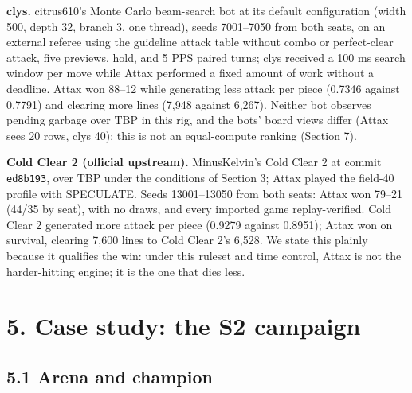 \documentclass[
  11pt,
]{article}
\begin{document}
\textbf{clys.} citrus610's Monte Carlo beam-search bot at its default
configuration (width 500, depth 32, branch 3, one thread), seeds
7001--7050 from both seats, on an external referee using the guideline
attack table without combo or perfect-clear attack, five previews, hold,
and 5 PPS paired turns; clys received a 100 ms search window per move
while Attax performed a fixed amount of work without a deadline. Attax
won 88--12 while generating less attack per piece (0.7346 against
0.7791) and clearing more lines (7,948 against 6,267). Neither bot
observes pending garbage over TBP in this rig, and the bots' board views
differ (Attax sees 20 rows, clys 40); this is not an equal-compute
ranking (Section 7).

\textbf{Cold Clear 2 (official upstream).} MinusKelvin's Cold Clear 2 at
commit \texttt{ed8b193}, over TBP under the conditions of Section 3;
Attax played the field-40 profile with SPECULATE. Seeds 13001--13050
from both seats: Attax won 79--21 (44/35 by seat), with no draws, and
every imported game replay-verified. Cold Clear 2 generated more attack
per piece (0.9279 against 0.8951); Attax won on survival, clearing 7,600
lines to Cold Clear 2's 6,528. We state this plainly because it
qualifies the win: under this ruleset and time control, Attax is not the
harder-hitting engine; it is the one that dies less.

\section{5. Case study: the S2
campaign}\label{case-study-the-s2-campaign}

\subsection{5.1 Arena and champion}\label{arena-and-champion}
\end{document}
